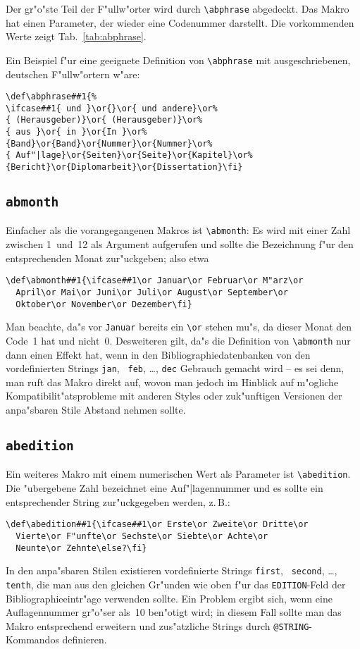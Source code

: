 Der gr"o"ste Teil der F"ullw"orter wird durch \verb|\abphrase| abgedeckt.
Das Makro hat einen Parameter, der wieder eine Codenummer darstellt.
Die vorkommenden Werte zeigt Tab.~\ref{tab:abphrase}.

Ein Beispiel f"ur eine geeignete Definition von \verb|\abphrase| mit
ausgeschriebenen, deutschen F"ullw"ortern w"are:
\begin{verbatim}
\def\abphrase##1{%
\ifcase##1{ und }\or{}\or{ und andere}\or%
{ (Herausgeber)}\or{ (Herausgeber)}\or%
{ aus }\or{ in }\or{In }\or%
{Band}\or{Band}\or{Nummer}\or{Nummer}\or%
{ Auf"|lage}\or{Seiten}\or{Seite}\or{Kapitel}\or%
{Bericht}\or{Diplomarbeit}\or{Dissertation}\fi}
\end{verbatim}

\subsection*{{\tt abmonth}}

Einfacher als die vorangegangenen Makros ist \verb|\abmonth|: Es wird mit
einer Zahl zwischen 1~und~12 als Argument aufgerufen und sollte die
Bezeichnung f"ur den entsprechenden Monat zur"uckgeben; also etwa
\begin{verbatim}
\def\abmonth##1{\ifcase##1\or Januar\or Februar\or M"arz\or
  April\or Mai\or Juni\or Juli\or August\or September\or
  Oktober\or November\or Dezember\fi}
\end{verbatim}
Man beachte, da"s vor \verb|Januar| bereits ein \verb|\or| stehen mu"s, da
dieser Monat den Code~1 hat und nicht~0. Desweiteren gilt, da"s die
Definition von \verb|\abmonth| nur dann einen Effekt hat, wenn in den
Bibliographiedatenbanken von den vordefinierten Strings {\tt jan}, {\tt
feb}, \dots, {\tt dec} Gebrauch gemacht wird -- es sei denn, man ruft das
Makro direkt auf, wovon man jedoch im Hinblick auf m"ogliche
Kompatibilit"atsprobleme mit anderen Styles oder zuk"unftigen Versionen der
anpa"sbaren Stile Abstand nehmen sollte.

\subsection*{{\tt abedition}}

Ein weiteres Makro mit einem numerischen Wert als Parameter ist
\verb|\abedition|. Die "ubergebene Zahl bezeichnet eine Auf"|lagennummer und
es sollte ein entsprechender String zur"uckgegeben werden, z.\,B.:
\begin{verbatim}
\def\abedition##1{\ifcase##1\or Erste\or Zweite\or Dritte\or
  Vierte\or F"unfte\or Sechste\or Siebte\or Achte\or
  Neunte\or Zehnte\else?\fi}
\end{verbatim}
In den anpa"sbaren Stilen existieren vordefinierte Strings {\tt first}, {\tt
second}, \dots, {\tt tenth}, die man aus den gleichen Gr"unden wie oben f"ur
das {\tt EDITION}-Feld der Bibliographieeintr"age verwenden sollte. Ein
Problem ergibt sich, wenn eine Auflagennummer gr"o"ser als~10 ben"otigt
wird; in diesem Fall sollte man das Makro entsprechend erweitern und
zus"atzliche Strings durch {\tt @STRING}-Kommandos definieren.

